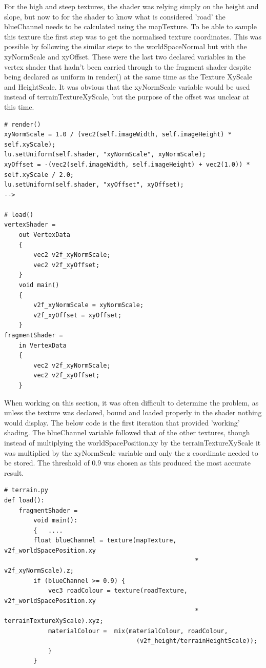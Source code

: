 \documentclass[a4 paper, 12pt]{article}
\begin{document}
For the high and steep textures, the shader was relying simply on the height and slope, but now to for the shader to know what is considered 'road' the blueChannel needs to be calculated using the mapTexture. To be able to sample this texture the first step was to get the normalised texture coordinates. This was possible by following the similar steps to the worldSpaceNormal but with the xyNormScale and xyOffset. These were the last two declared variables in the vertex shader that hadn't been carried through to the fragment shader despite being declared as uniform in render() at the same time as the Texture XyScale and HeightScale. It was obvious that the xyNormScale variable would be used instead of terrainTextureXyScale, but the purpose of the offset was unclear at this time. 
    \begin{lstlisting}
# render()      
xyNormScale = 1.0 / (vec2(self.imageWidth, self.imageHeight) * self.xyScale);
lu.setUniform(self.shader, "xyNormScale", xyNormScale);
xyOffset = -(vec2(self.imageWidth, self.imageHeight) + vec2(1.0)) * self.xyScale / 2.0;
lu.setUniform(self.shader, "xyOffset", xyOffset);
--> 

# load()
vertexShader =
    out VertexData
    {
        vec2 v2f_xyNormScale;
        vec2 v2f_xyOffset;
    }
    void main()
    {
        v2f_xyNormScale = xyNormScale;
        v2f_xyOffset = xyOffset;
    }
fragmentShader = 
    in VertexData
    {
        vec2 v2f_xyNormScale;
        vec2 v2f_xyOffset;
    }
        \end{lstlisting}

When working on this section, it was often difficult to determine the problem, as unless the texture was declared, bound and loaded properly in the shader nothing would display. The below code is the first iteration that provided 'working' shading. The blueChannel variable followed that of the other textures, though instead of multiplying the worldSpacePosition.xy by the terrainTextureXyScale it was multiplied by the xyNormScale variable and only the z coordinate needed to be stored. The threshold of 0.9 was chosen as this produced the most accurate result. 
    \begin{lstlisting}
# terrain.py       
def load():
    fragmentShader =                 
        void main():
        {   ....
        float blueChannel = texture(mapTexture, v2f_worldSpacePosition.xy 
                                                    * v2f_xyNormScale).z;
        if (blueChannel >= 0.9) {
            vec3 roadColour = texture(roadTexture, v2f_worldSpacePosition.xy 
                                                    * terrainTextureXyScale).xyz;
            materialColour =  mix(materialColour, roadColour, 
                                    (v2f_height/terrainHeightScale));
            }
        }
    \end{lstlisting} 
\end{document}
